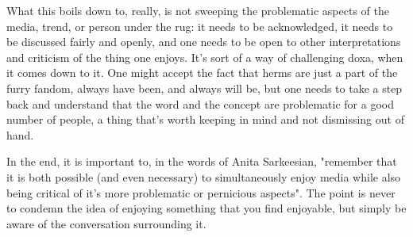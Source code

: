 What this boils down to, really, is not sweeping the problematic aspects of the media, trend, or person under the rug: it needs to be acknowledged, it needs to be discussed fairly and openly, and one needs to be open to other interpretations and criticism of the thing one enjoys. It's sort of a way of challenging doxa, when it comes down to it. One might accept the fact that herms are just a part of the furry fandom, always have been, and always will be, but one needs to take a step back and understand that the word and the concept are problematic for a good number of people, a thing that's worth keeping in mind and not dismissing out of hand.

In the end, it is important to, in the words of Anita Sarkeesian, "remember that it is both possible (and even necessary) to simultaneously enjoy media while also being critical of it's more problematic or pernicious aspects". The point is never to condemn the idea of enjoying something that you find enjoyable, but simply be aware of the conversation surrounding it.
